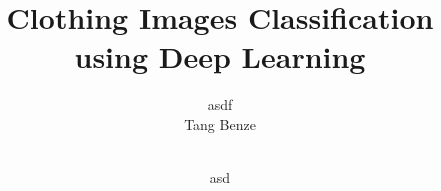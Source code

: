 \documentclass{acm_proc_article-sp}
\begin{document}
\title{Clothing Images Classification using Deep Learning}

\author{
\alignauthor
asdf\\
       \affaddr{}
\alignauthor
Tang Benze\\
       \\
\and %
\alignauthor
asd\\
       \affaddr{}
}
\date{}


\maketitle
\begin{abstract}
\end{abstract}

\keywords{} %






\end{document}
